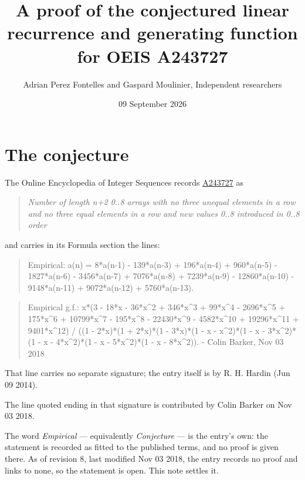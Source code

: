 \documentclass[11pt]{article}
\title{A proof of the conjectured linear recurrence and generating function for OEIS A243727}
\author{Adrian Perez Fontelles and Gaspard Moulinier, Independent researchers}
\date{09 September 2026}
\theoremstyle{definition}
\begin{document}
\maketitle
\section{The conjecture}

The Online Encyclopedia of Integer Sequences records \href{https://oeis.org/A243727}{A243727} as

\begin{quote}\itshape Number of length n+2 0..8 arrays with no three unequal elements in a row and no three equal elements in a row and new values 0..8 introduced in 0..8 order\end{quote}

and carries in its Formula section the lines:

\begin{quote}\ttfamily Empirical: a(n) = 8*a(n-1) - 139*a(n-3) + 196*a(n-4) + 960*a(n-5) - 1827*a(n-6) - 3456*a(n-7) + 7076*a(n-8) + 7239*a(n-9) - 12860*a(n-10) - 9148*a(n-11) + 9072*a(n-12) + 5760*a(n-13).\end{quote}

\begin{quote}\ttfamily Empirical g.f.: x*(3 - 18*x - 36*x\textasciicircum{}2 + 346*x\textasciicircum{}3 + 99*x\textasciicircum{}4 - 2696*x\textasciicircum{}5 + 175*x\textasciicircum{}6 + 10799*x\textasciicircum{}7 - 195*x\textasciicircum{}8 - 22430*x\textasciicircum{}9 - 4582*x\textasciicircum{}10 + 19296*x\textasciicircum{}11 + 9401*x\textasciicircum{}12) / ((1 - 2*x)*(1 + 2*x)*(1 - 3*x)*(1 - x - x\textasciicircum{}2)*(1 - x - 3*x\textasciicircum{}2)*(1 - x - 4*x\textasciicircum{}2)*(1 - x - 5*x\textasciicircum{}2)*(1 - x - 8*x\textasciicircum{}2)). - Colin Barker, Nov 03 2018\end{quote}

That line carries no separate signature; the entry itself is by R. H. Hardin (Jun 09 2014).

The line quoted ending in that signature is contributed by Colin Barker on Nov 03 2018.

The word {\itshape Empirical} --- equivalently {\itshape Conjecture} --- is the entry's own: the statement is recorded as fitted to the published terms, and no proof is given there. As of revision 8, last modified Nov 03 2018, the entry records no proof and links to none, so the statement is open. This note settles it.
\end{document}
